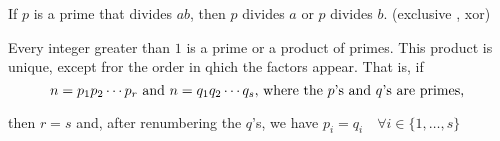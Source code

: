 \begin{thm-non}
  If $p$ is a prime that divides $ab$, then $p$ divides $a$ or $p$ divides $b$. (exclusive , xor)
\end{thm-non}

\begin{thm}
  Every integer greater than $1$ is a prime or a product of primes. This product is unique, except fror the order in qhich the factors appear. That is, if
  \begin{equation}
    n = p_1 p_2 \cdots p_r $ and $ n= q_1 q_2 \cdots q_s, $ where the $p$'s and $q$'s are primes, $
  \end{equation}

   then $r=s$ and, after renumbering the $q$'s, we have $p_i = q_i \quad \forall i \in \{1, \ldots, s\}$
\end{thm}